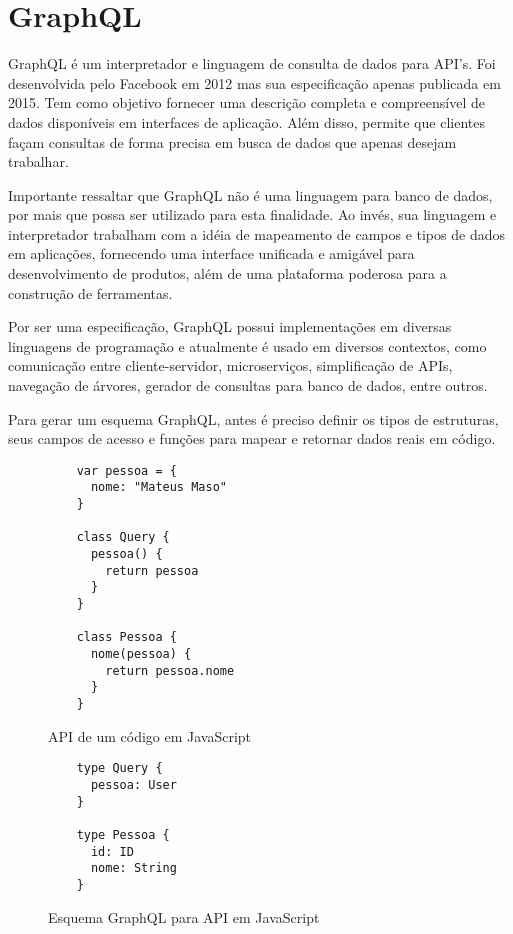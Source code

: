 \section{GraphQL}

GraphQL é um interpretador e linguagem de consulta de dados para API's. Foi desenvolvida pelo Facebook em 2012 mas sua especificação apenas publicada em 2015. Tem como objetivo fornecer uma descrição completa e compreensível de dados disponíveis em interfaces de aplicação. Além disso, permite que clientes façam consultas de forma precisa em busca de dados que apenas desejam trabalhar. \cite{GraphQL2016}

Importante ressaltar que GraphQL não é uma linguagem para banco de dados, por mais que possa ser utilizado para esta finalidade. Ao invés, sua linguagem e interpretador trabalham com a idéia de mapeamento de campos e tipos de dados em aplicações, fornecendo uma interface unificada e amigável para desenvolvimento de produtos, além de uma plataforma poderosa para a construção de ferramentas. \cite{GraphQL2016}

Por ser uma especificação, GraphQL possui implementações em diversas linguagens de programação e atualmente é usado em diversos contextos, como comunicação entre cliente-servidor, microserviços, simplificação de APIs, navegação de árvores, gerador de consultas para banco de dados, entre outros.

Para gerar um esquema GraphQL, antes é preciso definir os tipos de estruturas, seus campos de acesso e funções para mapear e retornar dados reais em código.

\begin{figure}[H]
  \centering
  \begin{verbatim}
    var pessoa = {
      nome: "Mateus Maso"
    }

    class Query {
      pessoa() {
        return pessoa
      }
    }

    class Pessoa {
      nome(pessoa) {
        return pessoa.nome
      }
    }
  \end{verbatim}
  \caption{API de um código em JavaScript}
\end{figure}

\begin{figure}[H]
  \centering
  \begin{verbatim}
    type Query {
      pessoa: User
    }

    type Pessoa {
      id: ID
      nome: String
    }
  \end{verbatim}
  \caption{Esquema GraphQL para API em JavaScript}
\end{figure}

